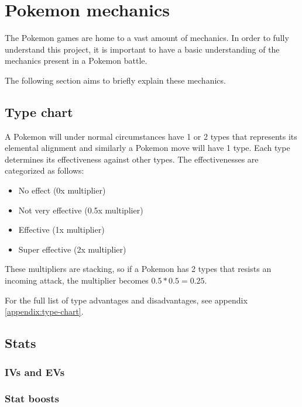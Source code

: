 \section{Pokemon mechanics}
\label{sec:pokemon-mechanics}

The Pokemon games are home to a vast amount of mechanics. In order to fully understand
this project, it is important to have a basic understanding of the mechanics present in a Pokemon battle.

The following section aims to briefly explain these mechanics.

\subsection{Type chart}
A Pokemon will under normal circumstances have 1 or 2 types that represents its elemental alignment and similarly a Pokemon move will have 1 type.
Each type determines its effectiveness against other types. The effectivenesses are categorized as follows:
\begin{itemize}
  \item No effect (0x multiplier)
  \item Not very effective (0.5x multiplier)
  \item Effective (1x multiplier)
  \item Super effective (2x multiplier)
\end{itemize}
These multipliers are stacking, so if a Pokemon has 2 types that resists an incoming attack, the multiplier becomes $ 0.5*0.5=0.25 $.

For the full list of type advantages and disadvantages, see appendix \ref{appendix:type-chart}. 

\subsection{Stats}
\subsubsection{IVs and EVs}
\subsubsection{Stat boosts}
